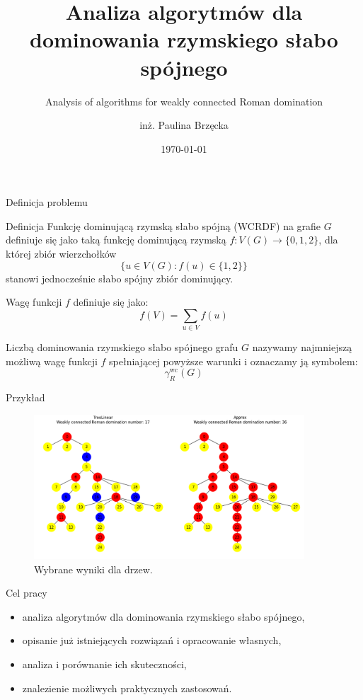 \documentclass[polish,aspectratio=169]{beamer}
\title[Algorytmy dominowania rzymskiego słabo spójnego]{Analiza algorytmów dla dominowania rzymskiego słabo spójnego}
\subtitle{Analysis of algorithms for weakly connected Roman domination}
\author{inż. Paulina Brzęcka}
\date{\today}
\begin{document}
\pgtitleframe

\begin{frame}{Definicja problemu}
    \begin{block}{Definicja}
        Funkcję dominującą rzymską słabo spójną (WCRDF) na grafie \( G \) definiuje się jako taką funkcję dominującą rzymską \( f \colon V(G) \to \{0, 1, 2\} \), dla której zbiór wierzchołków
        \[
        \{ u \in V(G) : f(u) \in \{1, 2\} \}
        \]
        stanowi jednocześnie słabo spójny zbiór dominujący.
        
        \vspace{1em}

        Wagę funkcji \( f \) definiuje się jako:
        \[
        f(V) = \sum_{u \in V} f(u)
        \]

        Liczbą dominowania rzymskiego słabo spójnego grafu \( G \) nazywamy najmniejszą możliwą wagę funkcji \( f \) spełniającej powyższe warunki i oznaczamy ją symbolem:
        \[
        \gamma^{\mathrm{wc}}_R(G)
        \]
    \end{block}
\end{frame}

\begin{frame}{Przykład}
    \begin{figure}
        \centering
        \includegraphics[width=0.9\textwidth]{images/image1.png}
        \caption{Wybrane wyniki dla drzew.}
    \end{figure}    
\end{frame}

\begin{frame}{Cel pracy}
    \begin{itemize}
        \item analiza algorytmów dla dominowania rzymskiego słabo spójnego,
        \item opisanie już istniejących rozwiązań i opracowanie własnych,
        \item analiza i porównanie ich skuteczności,
        \item znalezienie możliwych praktycznych zastosowań.
    \end{itemize}
\end{frame}
\end{document}
